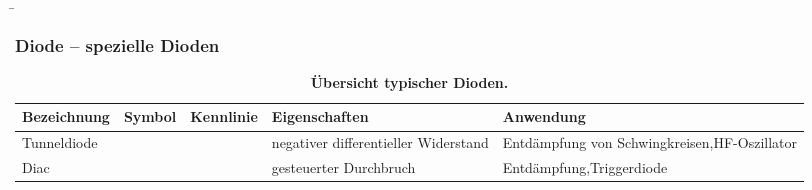 \begin{frame}
    \b{
        \frametitle{Diode -- spezielle Dioden}
        \begin{table}[H]
            \centering
            \begin{tabular}{ |p{2.1cm}|p{1.4cm}|p{3.2cm}|p{2.8cm}|p{3cm}| }
                \hline
                \textbf{Bezeichnung}                 & \textbf{Symbol} & \textbf{Kennlinie} & \textbf{Eigenschaften} & \textbf{Anwendung} \\
                \hline
                Tunnel\-diode
                                                     &
                \begin{minipage}[t][2.6cm][c]{1.4cm}
                    \centering 
                \end{minipage}
                                                     &
                \begin{minipage}[t][2.6cm][c]{3.3cm}
                    \centering 
                \end{minipage}
                                                     &
                negativer differentieller Widerstand &
                Entdämpfung von Schwingkreisen,\newline HF-Oszillator                                                                     \\
                \hline
                Diac
                                                     &
                \begin{minipage}[t][2.6cm][c]{1.4cm}
                    \centering 
                \end{minipage}
                                                     &
                \begin{minipage}[t][2.6cm][c]{3.3cm}
                    \centering 
                \end{minipage}
                                                     &
                gesteuerter Durchbruch               &
                Entdämpfung,\newline Triggerdiode                                                                                         \\
                \hline
            \end{tabular}
            \caption{\textbf{Übersicht typischer Dioden.}}
        \end{table}
    }

\end{frame}

